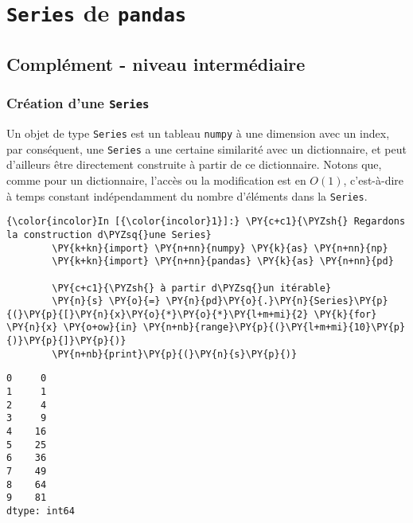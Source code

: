     
    
    
    

    

    \hypertarget{series-de-pandas}{%
\section{\texorpdfstring{\texttt{Series} de
\texttt{pandas}}{Series de pandas}}\label{series-de-pandas}}

    \hypertarget{compluxe9ment---niveau-intermuxe9diaire}{%
\subsection{Complément - niveau
intermédiaire}\label{compluxe9ment---niveau-intermuxe9diaire}}

    \hypertarget{cruxe9ation-dune-series}{%
\subsubsection{\texorpdfstring{Création d'une
\texttt{Series}}{Création d'une Series}}\label{cruxe9ation-dune-series}}

    Un objet de type \texttt{Series} est un tableau \texttt{numpy} à une
dimension avec un index, par conséquent, une \texttt{Series} a une
certaine similarité avec un dictionnaire, et peut d'ailleurs être
directement construite à partir de ce dictionnaire. Notons que, comme
pour un dictionnaire, l'accès ou la modification est en \(O(1)\),
c'est-à-dire à temps constant indépendamment du nombre d'éléments dans
la \texttt{Series}.

    \begin{Verbatim}[commandchars=\\\{\}]
{\color{incolor}In [{\color{incolor}1}]:} \PY{c+c1}{\PYZsh{} Regardons la construction d\PYZsq{}une Series}
        \PY{k+kn}{import} \PY{n+nn}{numpy} \PY{k}{as} \PY{n+nn}{np}
        \PY{k+kn}{import} \PY{n+nn}{pandas} \PY{k}{as} \PY{n+nn}{pd}
        
        \PY{c+c1}{\PYZsh{} à partir d\PYZsq{}un itérable}
        \PY{n}{s} \PY{o}{=} \PY{n}{pd}\PY{o}{.}\PY{n}{Series}\PY{p}{(}\PY{p}{[}\PY{n}{x}\PY{o}{*}\PY{o}{*}\PY{l+m+mi}{2} \PY{k}{for} \PY{n}{x} \PY{o+ow}{in} \PY{n+nb}{range}\PY{p}{(}\PY{l+m+mi}{10}\PY{p}{)}\PY{p}{]}\PY{p}{)}
        \PY{n+nb}{print}\PY{p}{(}\PY{n}{s}\PY{p}{)}
\end{Verbatim}


    \begin{Verbatim}[commandchars=\\\{\}]
0     0
1     1
2     4
3     9
4    16
5    25
6    36
7    49
8    64
9    81
dtype: int64

    \end{Verbatim}

